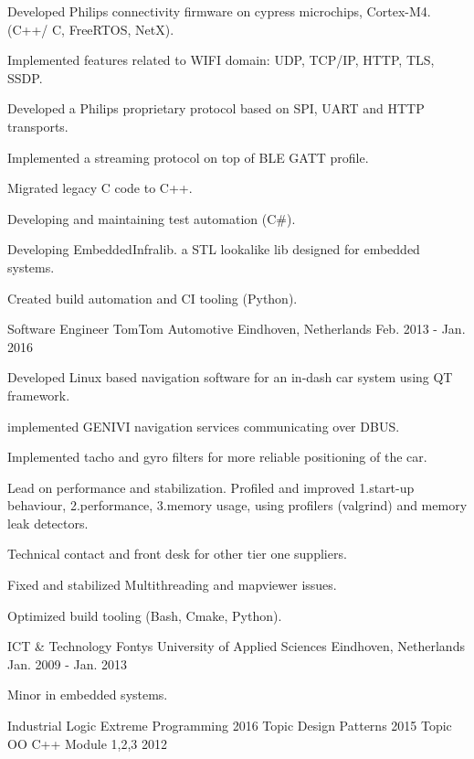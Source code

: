 \begin{cventries}
{\begin{cvitems}
        \item {Developed Philips connectivity firmware on cypress microchips, Cortex-M4.(C++/ C, FreeRTOS, NetX).}
        \item {Implemented features related to WIFI domain: UDP, TCP/IP, HTTP, TLS, SSDP.}
        \item {Developed a Philips proprietary protocol based on SPI, UART and HTTP transports.}
        \item {Implemented a streaming protocol on top of BLE GATT profile.}
        \item {Migrated legacy C code to C++.}
        \item {Developing and maintaining test automation (C\#).}
        \item {Developing EmbeddedInfralib. a STL lookalike lib designed for embedded systems.}
        \item {Created build automation and CI tooling (Python).}
      \end{cvitems}
    }
  \cventry
    {Software Engineer}
    {TomTom Automotive}
    {Eindhoven, Netherlands}
    {Feb. 2013 - Jan. 2016}
    {
      \begin{cvitems}
        \item {Developed Linux based navigation software for an in-dash car system using QT framework.}
        \item{implemented GENIVI navigation services communicating over DBUS.}
        \item {Implemented tacho and gyro filters for more reliable positioning of the car. }
        \item {Lead on performance and stabilization. Profiled and improved 1.start-up behaviour, 2.performance, 3.memory usage, using profilers (valgrind) and memory leak detectors.}
        \item {Technical contact and front desk for other tier one suppliers.}
        \item {Fixed and stabilized Multithreading and mapviewer issues.}
        \item {Optimized build tooling (Bash, Cmake, Python).}
      \end{cvitems}
    }
\end{cventries}
\newpage


\begin{cventries}
  \cventry
    {ICT \& Technology}
    {Fontys University of Applied Sciences}
    {Eindhoven, Netherlands}
    {Jan. 2009 - Jan. 2013}
    {
      \begin{cvitems}
        \item {Minor in embedded systems.}
      \end{cvitems}
    }
\end{cventries}
\begin{cventries}
  \cventry
    {Industrial Logic}
    {Extreme Programming}
    {}
    {2016}
    {}
      \cventry
    {Topic}
    {Design Patterns}
    {}
    {2015}
    {}
      \cventry
    {Topic}
    {OO C++ Module 1,2,3}
    {}
    {2012}
    {}
\end{cventries}

